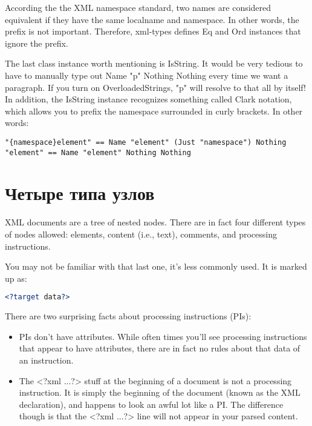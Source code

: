 According the the XML namespace standard, two names are considered equivalent if they have the same localname and namespace. In other words, the prefix is not important. Therefore, xml-types defines Eq and Ord instances that ignore the prefix.

The last class instance worth mentioning is IsString. It would be very tedious to have to manually type out Name "p" Nothing Nothing every time we want a paragraph. If you turn on OverloadedStrings, "p" will resolve to that all by itself! In addition, the IsString instance recognizes something called Clark notation, which allows you to prefix the namespace surrounded in curly brackets. In other words:

\begin{lstlisting}
"{namespace}element" == Name "element" (Just "namespace") Nothing
"element" == Name "element" Nothing Nothing
\end{lstlisting}

\section{Четыре типа узлов} %

XML documents are a tree of nested nodes. There are in fact four different types of nodes allowed: elements, content (i.e., text), comments, and processing instructions.

\begin{remark}
You may not be familiar with that last one, it's less commonly used. It is marked
up as:

\begin{lstlisting}[language=XML]
<?target data?>
\end{lstlisting}

There are two surprising facts about processing instructions (PIs):

\begin{itemize}
\item PIs don't have attributes. While often times you'll see processing instructions that appear to have attributes, there are in fact no rules about that data of an instruction.
\item The <?xml ...?> stuff at the beginning of a document is not a processing instruction. It is simply the beginning of the document (known as the XML declaration), and happens to look an awful lot like a PI. The difference though is that the <?xml ...?> line will not appear in your parsed content.
\end{itemize}
\end{remark}

